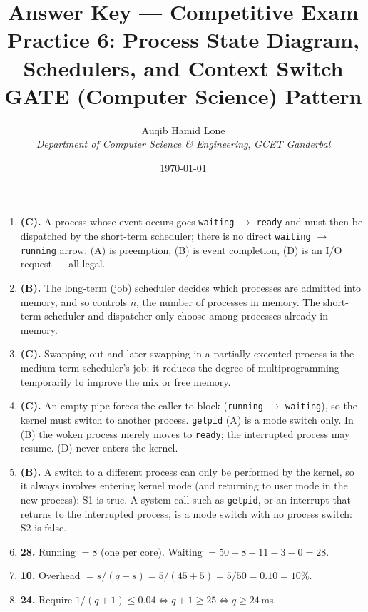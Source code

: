 \documentclass[11pt]{article}
\title{Answer Key --- Competitive Exam Practice 6: Process State Diagram, Schedulers, and Context Switch\\\large GATE (Computer Science) Pattern}
\author{Auqib Hamid Lone\\[0.3em]
  \emph{Department of Computer Science \& Engineering}, \emph{GCET Ganderbal}}
\date{\today}
\begin{document}
\maketitle

\begin{enumerate}
\item[\textbf{Q1}] \textbf{(C).} A process whose event occurs goes \texttt{waiting} $\to$ \texttt{ready} and must then be dispatched by the short-term scheduler; there is no direct \texttt{waiting} $\to$ \texttt{running} arrow. (A) is preemption, (B) is event completion, (D) is an I/O request --- all legal.

\item[\textbf{Q2}] \textbf{(B).} The long-term (job) scheduler decides which processes are admitted into memory, and so controls $n$, the number of processes in memory. The short-term scheduler and dispatcher only choose among processes already in memory.

\item[\textbf{Q3}] \textbf{(C).} Swapping out and later swapping in a partially executed process is the medium-term scheduler's job; it reduces the degree of multiprogramming temporarily to improve the mix or free memory.

\item[\textbf{Q4}] \textbf{(C).} An empty pipe forces the caller to block (\texttt{running} $\to$ \texttt{waiting}), so the kernel must switch to another process. \texttt{getpid} (A) is a mode switch only. In (B) the woken process merely moves to \texttt{ready}; the interrupted process may resume. (D) never enters the kernel.

\item[\textbf{Q5}] \textbf{(B).} A switch to a different process can only be performed by the kernel, so it always involves entering kernel mode (and returning to user mode in the new process): S1 is true. A system call such as \texttt{getpid}, or an interrupt that returns to the interrupted process, is a mode switch with no process switch: S2 is false.

\item[\textbf{Q6}] \textbf{28.} Running $= 8$ (one per core). Waiting $= 50 - 8 - 11 - 3 - 0 = 28$.

\item[\textbf{Q7}] \textbf{10.} Overhead $= s/(q+s) = 5/(45+5) = 5/50 = 0.10 = 10\%$.

\item[\textbf{Q8}] \textbf{24.} Require $1/(q+1) \le 0.04 \iff q + 1 \ge 25 \iff q \ge 24$\,ms.


\end{enumerate}
\end{document}
